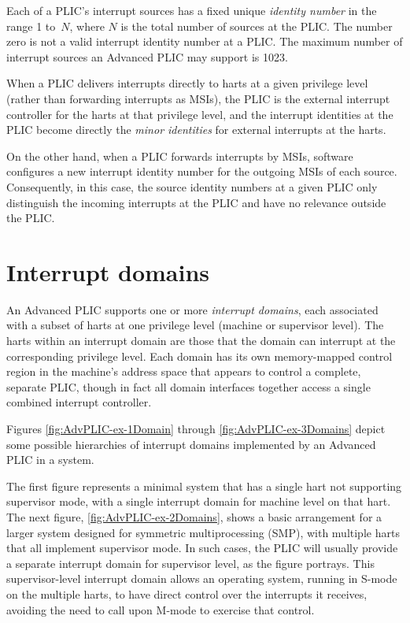 Each of a PLIC's interrupt sources has a fixed unique
\emph{identity number} in the range 1 to~$N$, where $N$ is the total
number of sources at the PLIC.
The number zero is not a valid interrupt identity number at a PLIC.
The maximum number of interrupt sources an Advanced PLIC may support is
1023.

When a PLIC delivers interrupts directly to harts at a given
privilege level (rather than forwarding interrupts as MSIs), the PLIC
is the external interrupt controller for the harts at that privilege
level, and the interrupt identities at the PLIC become directly the
\emph{minor identities} for external interrupts at the harts.

On the other hand, when a PLIC forwards interrupts by MSIs, software
configures a new interrupt identity number for the outgoing MSIs of
each source.
Consequently, in this case, the source identity numbers at a given
PLIC only distinguish the incoming interrupts at the PLIC and have no
relevance outside the PLIC.

\section{Interrupt domains}

An Advanced PLIC supports one or more \emph{interrupt domains}, each
associated with a subset of {\RISCV} harts at one privilege level
(machine or supervisor level).
The harts within an interrupt domain are those that the domain can
interrupt at the corresponding privilege level.
Each domain has its own memory-mapped control region in the machine's
address space that appears to control a complete, separate PLIC,
though in fact all domain interfaces together access a single combined
interrupt controller.

Figures \ref{fig:AdvPLIC-ex-1Domain} through
\ref{fig:AdvPLIC-ex-3Domains} depict some possible hierarchies of
interrupt domains implemented by an Advanced PLIC in a {\RISCV} system.

The first figure represents a minimal system that has a single hart not
supporting supervisor mode, with a single interrupt domain for machine
level on that hart.
The next figure, \ref{fig:AdvPLIC-ex-2Domains}, shows a basic
arrangement for a larger system designed for symmetric multiprocessing
(SMP), with multiple harts that all implement supervisor mode.
In such cases, the PLIC will usually provide a separate interrupt
domain for supervisor level, as the figure portrays.
This supervisor-level interrupt domain allows an operating system,
running in \mbox{S-mode} on the multiple harts, to have direct control
over the interrupts it receives, avoiding the need to call upon
\mbox{M-mode} to exercise that control.

